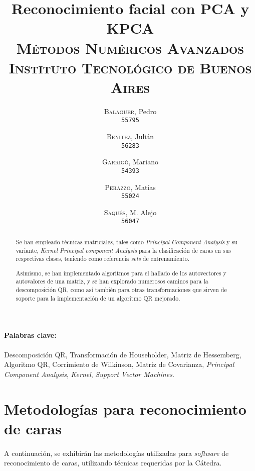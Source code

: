 \documentclass[12pt, twocolumn]{article}
\begin{document}
	\title{Reconocimiento facial con PCA y KPCA \\ 
		   \large{\textsc{Métodos Numéricos Avanzados}} \\
		   \normalsize{\textsc{Instituto Tecnológico de Buenos Aires}}}
	\author{
		\textsc{Balaguer}, Pedro \\
		\texttt{55795}
		\and
		\textsc{Benítez}, Julián \\
		\texttt{56283}
		\and
		\textsc{Garrigó}, Mariano \\
		\texttt{54393}
		\and
		\textsc{Perazzo}, Matías \\
		\texttt{55024}
		\and
		\textsc{Saqués}, M. Alejo \\
		\texttt{56047} 
	}
	\date{}
	\maketitle
	
	\begin{abstract}
		Se han empleado técnicas matriciales, tales como \textit{Principal Component Analysis} y su variante, \textit{Kernel Principal component Analysis} para la clasificación de caras en sus respectivas clases, teniendo como referencia \textit{sets} de entrenamiento.  
		
		Asimismo, se han implementado algoritmos para el hallado de los autovectores y autovalores de una matriz, y se han explorado numerosos caminos para la descomposición QR, como así también para otras transformaciones que sirven de soporte para la implementación de un algoritmo QR mejorado.   
	\end{abstract}
	
	\paragraph{Palabras clave:} Descomposición QR, Transformación de Householder, Matriz de Hessemberg, Algoritmo QR, Corrimiento de Wilkinson, Matriz de Covarianza, \textit{Principal Component Analysis}, \textit{Kernel}, \textit{Support Vector Machines}.
	
	\section{Metodologías para reconocimiento de caras}
	
	\paragraph{} A continuación, se exhibirán las metodologías utilizadas para \textit{software} de reconocimiento de caras, utilizando técnicas requeridas por la Cátedra. 	
	
\end{document}
